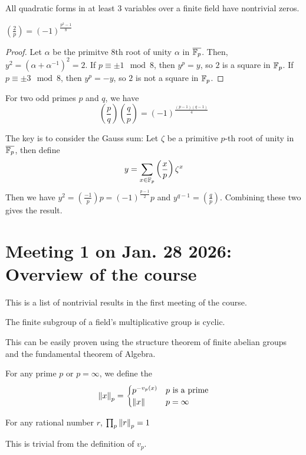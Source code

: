 \documentclass[15pt]{scrartcl}
\begin{document}
\begin{corollary}
    All quadratic forms in at least 3 variables over a finite field have nontrivial zeros. 
\end{corollary}
\begin{theorem}
    $\left( \frac{2}{p}\right)=(-1)^{\frac{p^2-1}{8}}$
\end{theorem}
\begin{proof}
    Let $\alpha$ be the primitve 8th root of unity $\alpha$ in $\overline{\mathbb F_p}$. Then, $y^2=(\alpha+\alpha^{-1})^2=2$. If $p\equiv \pm 1\mod 8$, then $y^p=y$, so $2$ is a square in $\mathbb F_p$. If $p\equiv \pm 3\mod 8$, then $y^p=-y$, so $2$ is not a square in $\mathbb F_p$.
\end{proof}
\begin{theorem}
    For two odd primes $p$ and $q$, we have
    \[\left( \frac{p}{q}\right)\left( \frac{q}{p}\right)=(-1)^{\frac{(p-1)(q-1)}{4}}\]
    
\end{theorem}
The key is to consider the Gauss sum: Let $\zeta$ be a primitive $p$-th root of unity in $\overline{\mathbb F_p}$, then define
\[y=\sum_{x\in \mathbb F_p}\left( \frac{x}{p}\right) \zeta^x\] 
Then we have $y^2=\left( \frac{-1}{p}\right)p=(-1)^{\frac{p-1}{2}}p$ and $y^{q-1}=\left( \frac{q}{p}\right)$. Combining these two gives the result.
\newpage
\section{Meeting 1 on Jan. 28 2026: Overview of the course}
This is a list of nontrivial results in the first meeting of the course.

\begin{theorem}
    The finite subgroup of a field's multiplicative group is cyclic.
\end{theorem}
This can be easily proven using the structure theorem of finite abelian groups and the fundamental theorem of Algebra. 
\begin{definition}
    For any prime $p$ or $p=\infty$, we define the 
    \[\left\lVert x \right\rVert_p=\begin{cases}
    p^{-v_p(x)} & p \text{ is a prime}\\
    \left\lVert x \right\rVert & p=\infty
    \end{cases}\]
\end{definition}
\begin{theorem}
    For any rational number $r$, $\prod_{p}\left\lVert r \right\rVert_p=1$ 
\end{theorem}
This is trivial from the definition of $v_p$.
\\
\end{document}
